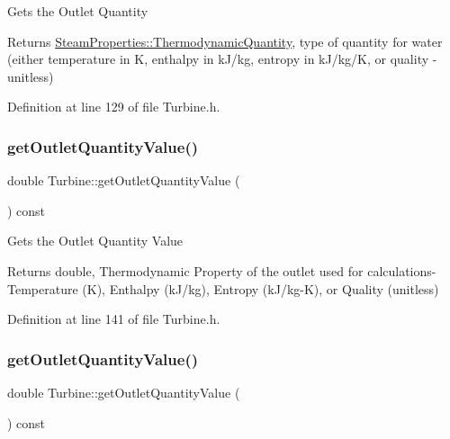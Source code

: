 Gets the Outlet Quantity

\begin{DoxyReturn}{Returns}
\hyperlink{class_steam_properties_ae0294bedf7d178c2d8fb6aed0f62fbff}{Steam\+Properties\+::\+Thermodynamic\+Quantity}, type of quantity for water (either temperature in K, enthalpy in k\+J/kg, entropy in k\+J/kg/K, or quality -\/ unitless) 
\end{DoxyReturn}


Definition at line 129 of file Turbine.\+h.

\mbox{\label{class_turbine_aca98f128213e02e95dfd6f4b2ad8de4e}} 
\subsubsection{\texorpdfstring{get\+Outlet\+Quantity\+Value()}{getOutletQuantityValue()}\hspace{0.1cm}{\footnotesize\ttfamily [1/3]}}
{\footnotesize\ttfamily double Turbine\+::get\+Outlet\+Quantity\+Value (\begin{DoxyParamCaption}{ }\end{DoxyParamCaption}) const\hspace{0.3cm}{\ttfamily [inline]}}

Gets the Outlet Quantity Value

\begin{DoxyReturn}{Returns}
double, Thermodynamic Property of the outlet used for calculations-\/ Temperature (K), Enthalpy (k\+J/kg), Entropy (k\+J/kg-\/K), or Quality (unitless) 
\end{DoxyReturn}


Definition at line 141 of file Turbine.\+h.

\mbox{\label{class_turbine_aca98f128213e02e95dfd6f4b2ad8de4e}} 
\subsubsection{\texorpdfstring{get\+Outlet\+Quantity\+Value()}{getOutletQuantityValue()}\hspace{0.1cm}{\footnotesize\ttfamily [2/3]}}
{\footnotesize\ttfamily double Turbine\+::get\+Outlet\+Quantity\+Value (\begin{DoxyParamCaption}{ }\end{DoxyParamCaption}) const\hspace{0.3cm}{\ttfamily [inline]}}

